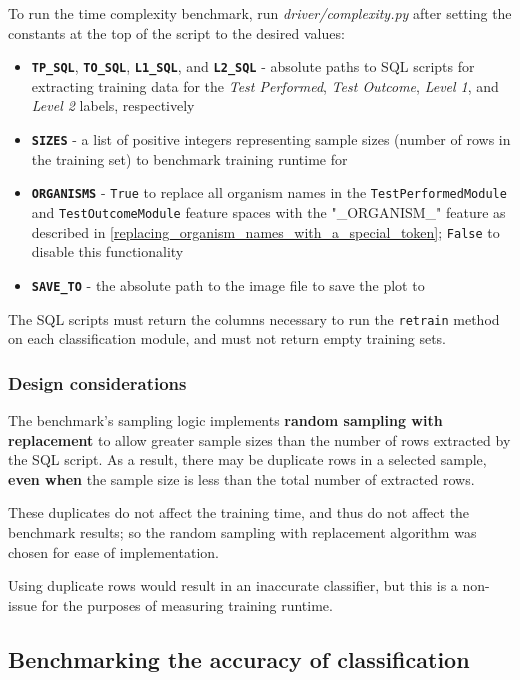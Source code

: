 \documentclass[a4paper]{article}
\begin{document}
To run the time complexity benchmark, run \textit{driver/complexity.py} after setting the constants at the top of the script to the desired values:

\begin{itemize}
\item \textbf{\lstinline{TP_SQL}}, \textbf{\lstinline{TO_SQL}}, \textbf{\lstinline{L1_SQL}}, and \textbf{\lstinline{L2_SQL}} - absolute paths to SQL scripts for extracting training data for the \textit{Test Performed}, \textit{Test Outcome}, \textit{Level 1}, and \textit{Level 2} labels, respectively
\item \textbf{\lstinline{SIZES}} - a list of positive integers representing sample sizes (number of rows in the training set) to benchmark training runtime for
\item \textbf{\lstinline{ORGANISMS}} - \lstinline{True} to replace all organism names in the \lstinline{TestPerformedModule} and \lstinline{TestOutcomeModule} feature spaces with the "\_ORGANISM\_" feature as described in \ref{replacing_organism_names_with_a_special_token}; \lstinline{False} to disable this functionality
\item \textbf{\lstinline{SAVE_TO}} - the absolute path to the image file to save the plot to
\end{itemize}

The SQL scripts must return the columns necessary to run the \lstinline{retrain} method on each classification module, and must not return empty training sets.

\subsubsection{Design considerations}

The benchmark's sampling logic implements \textbf{random sampling with replacement} to allow greater sample sizes than the number of rows extracted by the SQL script. As a result, there may be duplicate rows in a selected sample, \textbf{even when} the sample size is less than the total number of extracted rows.

These duplicates do not affect the training time, and thus do not affect the benchmark results; so the random sampling with replacement algorithm was chosen for ease of implementation.

Using duplicate rows would result in an inaccurate classifier, but this is a non-issue for the purposes of measuring training runtime.

\subsection{Benchmarking the accuracy of classification}
\end{document}
